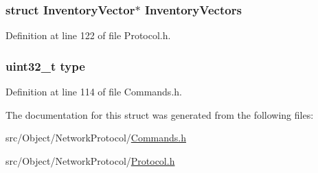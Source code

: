 \hypertarget{struct_cmd_inv_ab98754c1df21fac25844fc908ecefe29}{
\subsubsection[{InventoryVectors}]{\setlength{\rightskip}{0pt plus 5cm}struct {\bf InventoryVector}$\ast$ {\bf InventoryVectors}}}
\label{struct_cmd_inv_ab98754c1df21fac25844fc908ecefe29}


Definition at line 122 of file Protocol.h.

\hypertarget{struct_cmd_inv_ad44b615021ed3ccb734fcaf583ef4a03}{
\subsubsection[{type}]{\setlength{\rightskip}{0pt plus 5cm}uint32\_\-t {\bf type}}}
\label{struct_cmd_inv_ad44b615021ed3ccb734fcaf583ef4a03}


Definition at line 114 of file Commands.h.



The documentation for this struct was generated from the following files:\begin{DoxyCompactItemize}
\item 
src/Object/NetworkProtocol/\hyperlink{_commands_8h}{Commands.h}\item 
src/Object/NetworkProtocol/\hyperlink{_protocol_8h}{Protocol.h}\end{DoxyCompactItemize}
